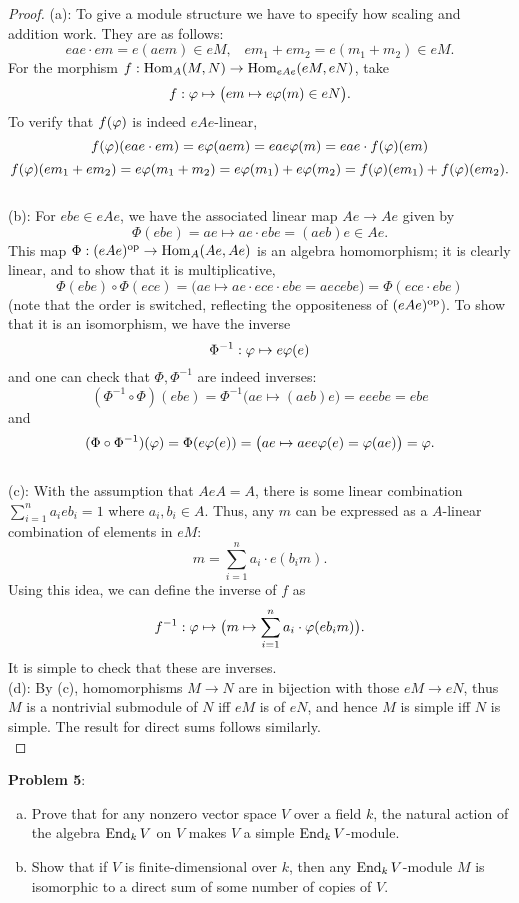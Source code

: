 \documentclass{amsart}
\begin{document}
\begin{proof}
	(a): To give a module structure we have to specify how scaling and addition work. They are as follows:
	$$
	eae \cdot em = e(aem) \in eM, \;\;\; em_1 + em_2 = e(m_1+m_2)\in eM.
	$$
	For the morphism $f:\operatorname{Hom}_A(M,N)\to \operatorname{Hom}_{eAe}(eM,eN)$, take
	$$
	f: \varphi \mapsto \big(em \mapsto e \varphi(m) \in eN\big).
	$$
	To verify that $f(\varphi)$ is indeed $eAe$-linear, 
	$$
	f(\varphi)(eae \cdot em) = e \varphi(aem) = eae \varphi(m) = eae\cdot  f(\varphi)(em)
	$$
	$$
	f(\varphi)(em_1 + em_2) = e\varphi(m_1+m_2) = e\varphi(m_1) + e\varphi(m_2)=f(\varphi)(em_1) + f(\varphi)(em_2).
	$$\\
	
	(b): For $ebe\in eAe$, we have the associated linear map $Ae\to Ae$ given by
	$$
	\Phi(ebe) = ae \mapsto ae \cdot ebe = (aeb)e \in Ae.
	$$
	This map $\Phi:(eAe)^{\rm{op}}\to \operatorname{Hom}_A(Ae,Ae)$ is an algebra homomorphism; it is clearly linear, and to show that it is multiplicative,
	$$
	\Phi(ebe) \circ \Phi(ece) = \big(ae \mapsto ae\cdot ece \cdot ebe = aecebe\big) = \Phi(ece \cdot ebe)
	$$
	(note that the order is switched, reflecting the oppositeness of $(eAe)^{\rm{op}}$).
	To show that it is an isomorphism, we have the inverse 
	$$
	\Phi^{-1}: \varphi \mapsto e\varphi(e)
	$$ 
	and one can check that $\Phi,\Phi^{-1}$ are indeed inverses:
	$$
	(\Phi^{-1}\circ \Phi)(ebe) = \Phi^{-1}\big(ae \mapsto (aeb)e\big) = eeebe = ebe
	$$
	and 
	$$
	(\Phi\circ \Phi^{-1})(\varphi) = \Phi(e\varphi(e)) = \big(ae \mapsto ae e\varphi(e) = \varphi(ae)\big) = \varphi.
	$$\\
	
	(c): With the assumption that $AeA=A$, there is some linear combination $\sum_{i=1}^n a_ieb_i = 1$ where $a_i,b_i\in A$. Thus, any $m$ can be expressed as a $A$-linear combination of elements in $eM$:
	$$
	m = \sum_{i=1}^n a_i\cdot e(b_im).
	$$
	Using this idea, we can define the inverse of $f$ as
	$$
	f^{-1}: \varphi \mapsto \big(m \mapsto \sum_{i=1}^na_i \cdot \varphi(eb_im)\big).
	$$
	It is simple to check that these are inverses.\\
	
	(d): By (c), homomorphisms $M\to N$ are in bijection with those $eM\to eN$, thus $M$ is a nontrivial submodule of $N$ iff $eM$ is of $eN$, and hence $M$ is simple iff $N$ is simple. The result for direct sums follows similarly.\\
	
\end{proof}
	
\newpage
	
\noindent \textbf{Problem 5}: 
\begin{enumerate}[(a)]
	\item Prove that for any nonzero vector space $V$ over a field $k$, the natural action of the algebra $\operatorname{End}_k V$ on $V$ makes $V$ a simple $\operatorname{End}_k V$-module.
	\item Show that if $V$ is finite-dimensional over $k$, then any $\operatorname{End}_k V$-module $M$ is isomorphic to a direct sum of some number of copies of $V$.
\end{enumerate}
\end{document}
